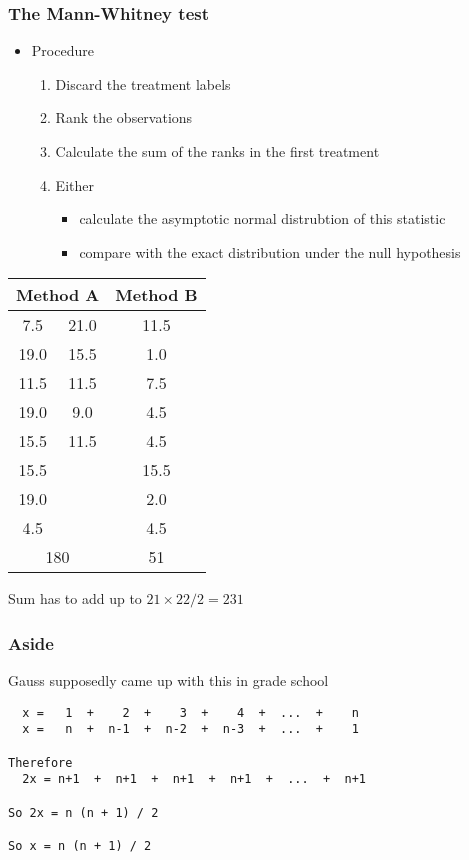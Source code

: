 \documentclass[aspectratio=169]{beamer}
\begin{document}
\begin{frame}\frametitle{The Mann-Whitney test}
\begin{itemize}
\item Procedure
  \begin{enumerate}
  \item Discard the treatment labels
  \item Rank the observations 
  \item Calculate the sum of the ranks in the first treatment
  \item Either 
    \begin{itemize}
    \item calculate the asymptotic normal distrubtion of 
      this statistic
    \item compare with the exact distribution under the null hypothesis
    \end{itemize}
\end{enumerate}
\end{itemize}
\end{frame}

\begin{frame}
\begin{center}
\ttfamily
  \begin{tabular}{|cc|c|} \hline
\multicolumn{2}{|c|}{Method A} & Method B \\ \hline
 7.5  & 21.0  & 11.5  \\
19.0  & 15.5  &  1.0  \\
11.5  & 11.5  &  7.5  \\
19.0  &  9.0  &  4.5  \\
15.5  & 11.5  &  4.5  \\
15.5  &       & 15.5  \\
19.0  &       &  2.0  \\
 4.5  &       &  4.5  \\ \hline
\multicolumn{2}{|c|}{180} & 51 \\ \hline
  \end{tabular}
\end{center}
Sum has to add up to $21 \times 22 / 2 = 231$ \normalsize \normalfont
\end{frame}

\begin{frame}[fragile]\frametitle{Aside}
Gauss supposedly came up with this in grade school
\begin{verbatim}
  x =   1  +    2  +    3  +    4  +  ...  +    n
  x =   n  +  n-1  +  n-2  +  n-3  +  ...  +    1

Therefore
  2x = n+1  +  n+1  +  n+1  +  n+1  +  ...  +  n+1

So 2x = n (n + 1) / 2

So x = n (n + 1) / 2
\end{verbatim}
\end{frame}
\end{document}
